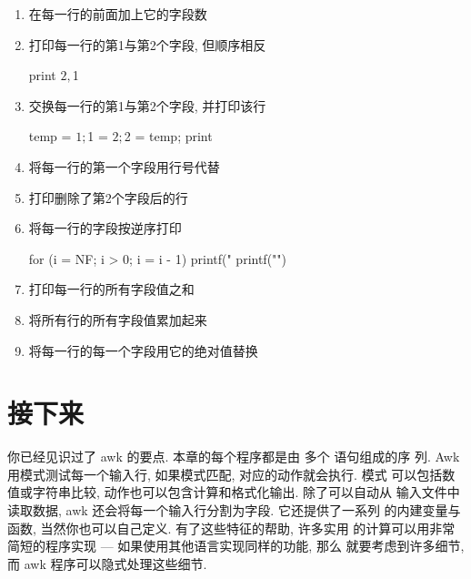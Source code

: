 \begin{enumerate}
\begin{awkcode}
    $NF > 0
\end{awkcode}
\item 打印长度超过80个字符的行
\begin{awkcode}
    length($0) > 80
\end{awkcode}
\item 在每一行的前面加上它的字段数
\item 打印每一行的第1与第2个字段, 但顺序相反
\begin{awkcode}
    { print $2, $1 }
\end{awkcode}
\item 交换每一行的第1与第2个字段, 并打印该行
\begin{awkcode}
    { temp = $1; $1 = $2; $2 = temp; print }
\end{awkcode}
\item 将每一行的第一个字段用行号代替
\item 打印删除了第2个字段后的行
\item 将每一行的字段按逆序打印
\begin{awkcode}
    { for (i = NF; i > 0; i = i - 1) printf("%
      printf("\n")
    }
\end{awkcode}
\item 打印每一行的所有字段值之和
\item 将所有行的所有字段值累加起来
\item 将每一行的每一个字段用它的绝对值替换
\end{enumerate}

\section{接下来}
\label{sec:what_next}
你已经见识过了 awk 的要点. 本章的每个程序都是由
多个 \patact 语句组成的序
列. Awk 用模式测试每一个输入行, 如果模式匹配, 对应的动作就会执行. 模式
可以包括数值或字符串比较, 动作也可以包含计算和格式化输出. 除了可以自动从
输入文件中读取数据, awk 还会将每一个输入行分割为字段. 它还提供了一系列
的内建变量与函数, 当然你也可以自己定义. 有了这些特征的帮助, 许多实用
的计算可以用非常简短的程序实现 --- 如果使用其他语言实现同样的功能, 那么
就要考虑到许多细节, 而 awk 程序可以隐式处理这些细节.

